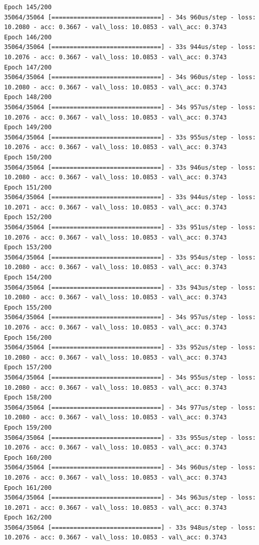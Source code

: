 \documentclass[11pt]{article}
\begin{document}
\begin{Verbatim}[commandchars=\\\{\}]
Epoch 145/200
35064/35064 [==============================] - 34s 960us/step - loss: 10.2080 - acc: 0.3667 - val\_loss: 10.0853 - val\_acc: 0.3743
Epoch 146/200
35064/35064 [==============================] - 33s 944us/step - loss: 10.2076 - acc: 0.3667 - val\_loss: 10.0853 - val\_acc: 0.3743
Epoch 147/200
35064/35064 [==============================] - 34s 960us/step - loss: 10.2080 - acc: 0.3667 - val\_loss: 10.0853 - val\_acc: 0.3743
Epoch 148/200
35064/35064 [==============================] - 34s 957us/step - loss: 10.2076 - acc: 0.3667 - val\_loss: 10.0853 - val\_acc: 0.3743
Epoch 149/200
35064/35064 [==============================] - 33s 955us/step - loss: 10.2076 - acc: 0.3667 - val\_loss: 10.0853 - val\_acc: 0.3743
Epoch 150/200
35064/35064 [==============================] - 33s 946us/step - loss: 10.2080 - acc: 0.3667 - val\_loss: 10.0853 - val\_acc: 0.3743
Epoch 151/200
35064/35064 [==============================] - 33s 944us/step - loss: 10.2071 - acc: 0.3667 - val\_loss: 10.0853 - val\_acc: 0.3743
Epoch 152/200
35064/35064 [==============================] - 33s 951us/step - loss: 10.2076 - acc: 0.3667 - val\_loss: 10.0853 - val\_acc: 0.3743
Epoch 153/200
35064/35064 [==============================] - 33s 954us/step - loss: 10.2080 - acc: 0.3667 - val\_loss: 10.0853 - val\_acc: 0.3743
Epoch 154/200
35064/35064 [==============================] - 33s 943us/step - loss: 10.2080 - acc: 0.3667 - val\_loss: 10.0853 - val\_acc: 0.3743
Epoch 155/200
35064/35064 [==============================] - 34s 957us/step - loss: 10.2076 - acc: 0.3667 - val\_loss: 10.0853 - val\_acc: 0.3743
Epoch 156/200
35064/35064 [==============================] - 33s 952us/step - loss: 10.2080 - acc: 0.3667 - val\_loss: 10.0853 - val\_acc: 0.3743
Epoch 157/200
35064/35064 [==============================] - 34s 955us/step - loss: 10.2080 - acc: 0.3667 - val\_loss: 10.0853 - val\_acc: 0.3743
Epoch 158/200
35064/35064 [==============================] - 34s 977us/step - loss: 10.2080 - acc: 0.3667 - val\_loss: 10.0853 - val\_acc: 0.3743
Epoch 159/200
35064/35064 [==============================] - 33s 955us/step - loss: 10.2076 - acc: 0.3667 - val\_loss: 10.0853 - val\_acc: 0.3743
Epoch 160/200
35064/35064 [==============================] - 34s 960us/step - loss: 10.2076 - acc: 0.3667 - val\_loss: 10.0853 - val\_acc: 0.3743
Epoch 161/200
35064/35064 [==============================] - 34s 963us/step - loss: 10.2071 - acc: 0.3667 - val\_loss: 10.0853 - val\_acc: 0.3743
Epoch 162/200
35064/35064 [==============================] - 33s 948us/step - loss: 10.2076 - acc: 0.3667 - val\_loss: 10.0853 - val\_acc: 0.3743

\end{Verbatim}
\end{document}
